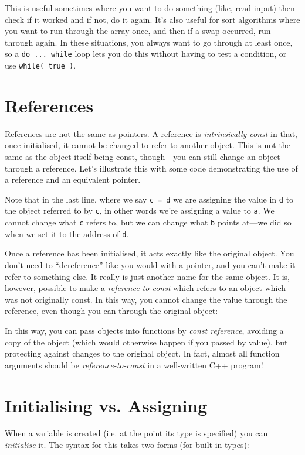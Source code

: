 \documentclass[a4paper]{scrartcl}
\begin{document}


This is useful sometimes where you want to do something (like, read input) then check if it worked and if not, do it again. It's also useful for sort algorithms where you want to run through the array once, and then if a swap occurred, run through again. In these situations, you always want to go through at least once, so a \verb|do ... while| loop lets you do this without having to test a condition, or use \verb|while( true )|.

\section{References}
References are not the same as pointers. A reference is \emph{intrinsically const} in that, once initialised, it cannot be changed to refer to another object. This is not the same as the object itself being const, though---you can still change an object through a reference. Let's illustrate this with some code demonstrating the use of a reference and an equivalent pointer.



Note that in the last line, where we say \verb|c = d| we are assigning the value in \verb|d| to the object referred to by \verb|c|, in other words we're assigning a value to \verb|a|. We cannot change what \verb|c| refers to, but we can change what \verb|b| points at---we did so when we set it to the address of \verb|d|.

Once a reference has been initialised, it acts exactly like the original object. You don't need to ``dereference'' like you would with a pointer, and you can't make it refer to something else. It really is just another name for the same object. It is, however, possible to make a \emph{reference-to-const} which refers to an object which was not originally const. In this way, you cannot change the value through the reference, even though you can through the original object:



In this way, you can pass objects into functions by \emph{const reference}, avoiding a copy of the object (which would otherwise happen if you passed by value), but protecting against changes to the original object. In fact, almost all function arguments should be \emph{reference-to-const} in a well-written C++ program!

\section{Initialising vs. Assigning}
When a variable is created (i.e. at the point its type is specified) you can \emph{initialise} it. The syntax for this takes two forms (for built-in types):
\end{document}

